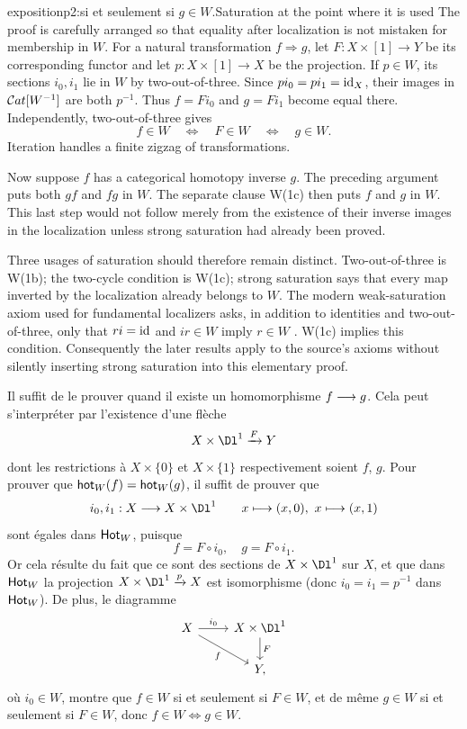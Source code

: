 \begin{dcomment}{exposition}{p2:si et seulement si $g \in W$.}{Saturation at the point where it is used}
The proof is carefully arranged so that equality after localization is not mistaken for membership in \(W\). For a natural transformation \(f\Rightarrow g\), let \(F:X\times[1]\to Y\) be its corresponding functor and let \(p:X\times[1]\to X\) be the projection. If \(p\in W\), its sections \(i_0,i_1\) lie in \(W\) by two-out-of-three. Since \(pi_0=pi_1=\mathrm{id}_X\), their images in \(\mathcal{C}at[W^{-1}]\) are both \(p^{-1}\). Thus \(f=Fi_0\) and \(g=Fi_1\) become equal there. Independently, two-out-of-three gives
\[
 f\in W\quad\Longleftrightarrow\quad F\in W
 \quad\Longleftrightarrow\quad g\in W.
\]
Iteration handles a finite zigzag of transformations.

Now suppose \(f\) has a categorical homotopy inverse \(g\). The preceding argument puts both \(gf\) and \(fg\) in \(W\). The separate clause W(1c) then puts \(f\) and \(g\) in \(W\). This last step would not follow merely from the existence of their inverse images in the localization unless strong saturation had already been proved.

Three usages of saturation should therefore remain distinct. Two-out-of-three is W(1b); the two-cycle condition is W(1c); strong saturation says that every map inverted by the localization already belongs to \(W\). The modern weak-saturation axiom used for fundamental localizers asks, in addition to identities and two-out-of-three, only that \(ri=\mathrm{id}\) and \(ir\in W\) imply \(r\in W\) \citep[Definition~1.1.1]{Cisinski2004Minimal}. W(1c) implies this condition. Consequently the later results apply to the source's axioms without silently inserting strong saturation into this elementary proof.
\end{dcomment}


Il suffit de le prouver quand il existe un homomorphisme $f \longrightarrow g$. Cela peut s'interpréter par l'existence d'une flèche
\[ X \times \Dl^1 \xrightarrow{F} Y \]
dont les restrictions à $X \times \{0\}$ et $X \times \{1\}$ respectivement soient $f$, $g$. Pour prouver que $\mathsf{hot}_W(f) = \mathsf{hot}_W(g)$, il suffit de prouver que
\[ i_0, i_1 : X \fl X \times \Dl^1 \qquad x \longmapsto (x,0),\ x \longmapsto (x,1) \]
sont égales dans $\mathsf{Hot}_W$, puisque
\[ f = F \circ i_0, \quad g = F \circ i_1. \]
Or cela résulte du fait que ce sont des sections de $X \times \Dl^1$ sur $X$, et que dans $\mathsf{Hot}_W$ la projection $X \times \Dl^1 \xrightarrow{p} X$ est isomorphisme (donc $i_0 = i_1 = p^{-1}$ dans $\mathsf{Hot}_W$). De plus, le diagramme
\[
\begin{tikzcd}
X \arrow[r, "i_0"] \arrow[dr, "f"'] & X \times \Dl^1 \arrow[d, "F"] \\
& Y,
\end{tikzcd}
\]
où $i_0 \in W$, montre que $f \in W$ si et seulement si $F \in W$, et de même $g \in W$ si et seulement si $F \in W$, donc $f \in W \Longleftrightarrow g \in W$.

